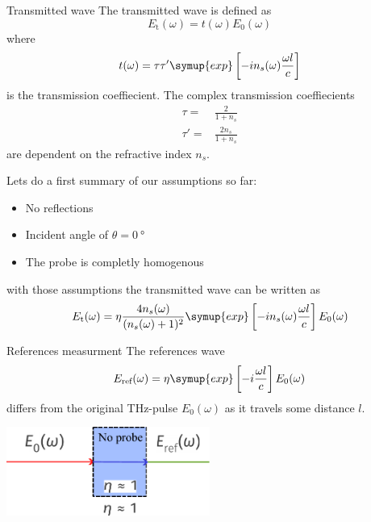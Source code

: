 \documentclass[aspectratio=1610, 9pt]{beamer}
\begin{document}
\begin{frame}{Transmitted wave}
  The transmitted wave is defined as 
  \begin{equation}
    E_\text{t}(\omega) = t(\omega) E_0(\omega)
  \end{equation}
  where
  \begin{equation}
    t(\omega) = \tau \tau' \symup{exp}\left[- i n_s(\omega) \frac{\omega l }{c}\right]
  \end{equation}
  is the transmission coeffiecient.
  The complex transmission coeffiecients 
  \begin{align}
    \tau = & \frac{2}{1 + n_s} \\
    \tau' = &  \frac{2 n_s}{1+ n_s} 
  \end{align}
  are dependent on the refractive index $n_s$.
\end{frame}

\begin{frame}
  Lets do a first summary of our assumptions so far:
  \begin{itemize}
    \item No reflections
    \item Incident angle of $\theta=\SI{0}{\degree}$
    \item The probe is completly homogenous
  \end{itemize}
  with those assumptions the transmitted wave can be written as 
  \begin{equation}
    E_\text{t}(\omega) = \eta\frac{4 n_s (\omega)}{(n_s(\omega) + 1)^2} \symup{exp}\left[ -i n_s (\omega) \frac{\omega l }{c}\right] E_0(\omega)
  \end{equation}
\end{frame}

\begin{frame}{References measurment}
  The references wave 
  \begin{equation}
  E_\text{ref}(\omega) = \eta \symup{exp}\left[ -i \frac{\omega l }{c}\right] E_0(\omega)  
  \end{equation}
  differs from the original THz-pulse $E_0(\omega)$ as it travels some distance $l$.
  \begin{center}
  \includegraphics[width=0.5\textwidth]{images/reference.pdf}
  \end{center}
\end{frame}
\end{document}
